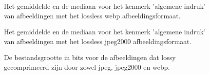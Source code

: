 \FloatBarrier
\begin{figure}[h!]
	\centering
	\caption{Het gemiddelde en de mediaan voor het kenmerk 'algemene indruk' van afbeeldingen met het \gls{lossless} \gls{webp} afbeeldingsformaat.}
	\label{fig:bijlages-onderzoek-resultaten-lossless-webp-gem-med}
\end{figure}
\FloatBarrier

\FloatBarrier
\begin{figure}[h!]
	\centering
	\caption{Het gemiddelde en de mediaan voor het kenmerk 'algemene indruk' van afbeeldingen met het \gls{lossless} \gls{jpeg2000} afbeeldingsformaat.}
	\label{fig:bijlages-onderzoek-resultaten-lossless-jpeg2000-gem-med}
\end{figure}
\FloatBarrier

\FloatBarrier
\begin{figure}[h!]
	\centering
	\caption{De bestandsgrootte in \glspl{bit} voor de afbeeldingen dat \gls{lossy} gecomprimeerd zijn door zowel \gls{jpeg}, \gls{jpeg2000} en \gls{webp}.}
	\label{fig:onderzoek-resultaten-lossy-sizes}
\end{figure}
\FloatBarrier

